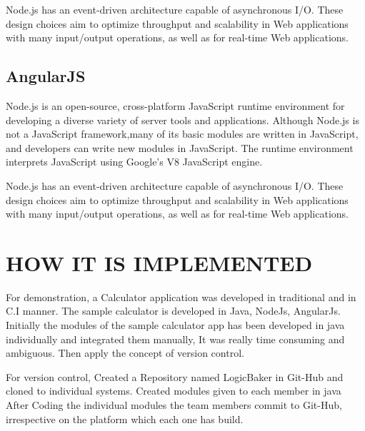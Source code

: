 \documentclass[12pt,a4paper,oneside]{report}
\begin{document}
{Node.js has an event-driven architecture capable of asynchronous I/O. These design choices aim to optimize throughput and scalability in Web applications with many input/output operations, as well as for real-time Web applications.

\subsection{AngularJS}
\par
Node.js is an open-source, cross-platform JavaScript runtime environment for developing a diverse variety of server tools and applications. Although Node.js is not a JavaScript framework,many of its basic modules are written in JavaScript, and developers can write new modules in JavaScript. The runtime environment interprets JavaScript using Google's V8 JavaScript engine.

Node.js has an event-driven architecture capable of asynchronous I/O. These design choices aim to optimize throughput and scalability in Web applications with many input/output operations, as well as for real-time Web applications.
\pagebreak
\section{HOW IT IS IMPLEMENTED}
\par For demonstration, a Calculator application was developed in traditional and in C.I manner. The sample calculator is developed in Java, NodeJs, AngularJs.
Initially the modules of the sample calculator app has been developed in java individually and integrated them manually, It was really time consuming and ambiguous. Then apply the concept of version control.
\par
   For version control, Created a Repository named LogicBaker in Git-Hub and cloned to individual systems. Created modules given to each member in java After Coding the individual modules the team members commit to Git-Hub, irrespective on the platform which each one has build.
   
}
\end{document}
